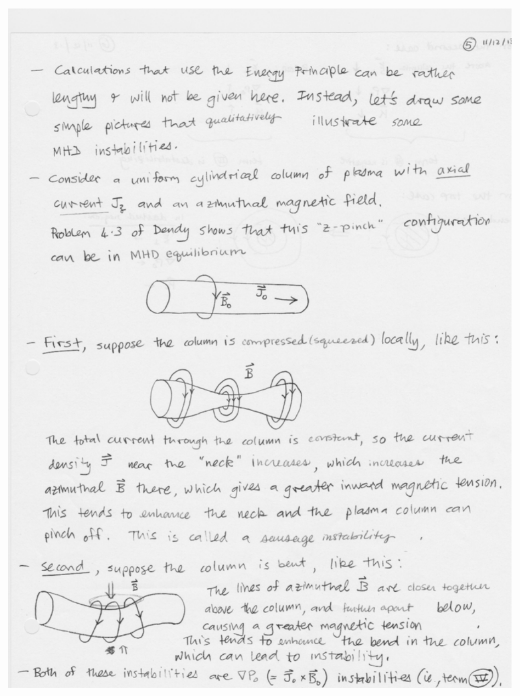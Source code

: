 \begin{marginfigure}
{		\includegraphics[width=\columnwidth]{figures/mhd_instability_sausage.pdf}
		\label{fig:sausage}
		}
		\subfigure[]{%
}
\end{marginfigure}

